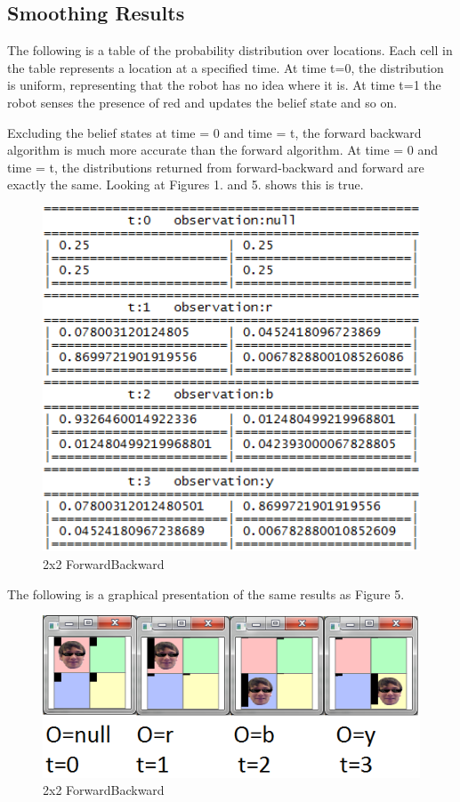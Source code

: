 \documentclass[a4paper]{article}
\begin{document}
\subsection{Smoothing Results}


The following is a table of the probability distribution over locations. Each cell in the table represents a location at a specified time. At time t=0, the distribution is uniform, representing that the robot has no idea where it is. At time t=1 the robot senses the presence of red and updates the belief state and so on.

Excluding the belief states at time = 0 and time = t, the forward backward algorithm is much more accurate than the forward algorithm. At time = 0 and time = t, the distributions returned from forward-backward and forward are exactly the same. Looking at Figures 1. and 5. shows this is true.
\begin{figure}[H]
\centering
\includegraphics[width=1\textwidth]{2x2Smoothingtext.png}
\caption{\label{fig:2x2 maze}2x2 ForwardBackward}
\end{figure}

The following is a graphical presentation of the same results as Figure 5.

\begin{figure}[H]
\centering
\includegraphics[width=1\textwidth]{2x2Smoothing.png}
\caption{\label{fig:2x2 maze}2x2 ForwardBackward}
\end{figure}
\end{document}
